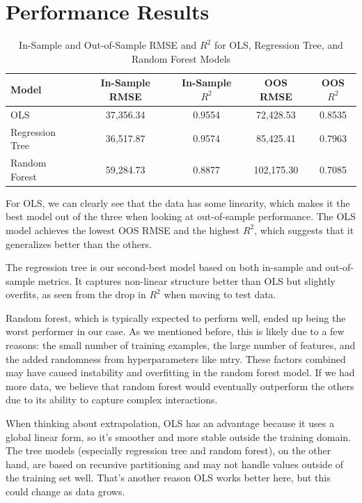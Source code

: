 \documentclass[12pt]{article}
\begin{document}
\section{Performance Results}

\begin{table}[H]
\centering
\renewcommand{\arraystretch}{1.2}
\begin{tabular}{|l|c|c|c|c|}
\hline
\textbf{Model} & \textbf{In-Sample RMSE} & \textbf{In-Sample $R^2$} & \textbf{OOS RMSE} & \textbf{OOS $R^2$} \\
\hline
OLS & 37,356.34 & 0.9554 & 72,428.53 & 0.8535 \\
Regression Tree & 36,517.87 & 0.9574 & 85,425.41 & 0.7963 \\
Random Forest & 59,284.73 & 0.8877 & 102,175.30 & 0.7085 \\
\hline
\end{tabular}
\caption{In-Sample and Out-of-Sample RMSE and $R^2$ for OLS, Regression Tree, and Random Forest Models}
\label{tab:model_performance}
\end{table}

For OLS, we can clearly see that the data has some linearity, which makes it the best model out of the three when looking at out-of-sample performance. The OLS model achieves the lowest OOS RMSE and the highest $R^2$, which suggests that it generalizes better than the others.

The regression tree is our second-best model based on both in-sample and out-of-sample metrics. It captures non-linear structure better than OLS but slightly overfits, as seen from the drop in $R^2$ when moving to test data.

Random forest, which is typically expected to perform well, ended up being the worst performer in our case. As we mentioned before, this is likely due to a few reasons: the small number of training examples, the large number of features, and the added randomness from hyperparameters like mtry. These factors combined may have caused instability and overfitting in the random forest model. If we had more data, we believe that random forest would eventually outperform the others due to its ability to capture complex interactions.

When thinking about extrapolation, OLS has an advantage because it uses a global linear form, so it’s smoother and more stable outside the training domain. The tree models (especially regression tree and random forest), on the other hand, are based on recursive partitioning and may not handle values outside of the training set well. That’s another reason OLS works better here, but this could change as data grows.
\end{document}
